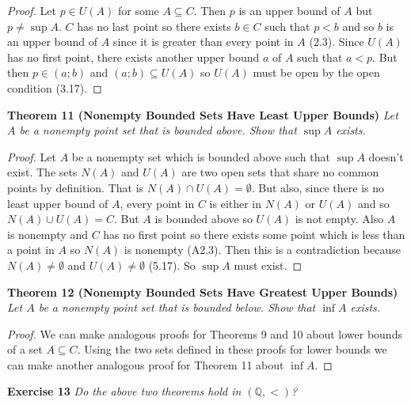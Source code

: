 \documentclass{article}
\begin{document}
\begin{flushleft}
\begin{proof}
Let $p \in U(A)$ for some $A \subseteq C$. Then $p$ is an upper bound of $A$ but $p \neq \sup A$. $C$ has no last point so there exists $b \in C$ such that $p<b$ and so $b$ is an upper bound of $A$ since it is greater than every point in $A$ (2.3). Since $U(A)$ has no first point, there exists another upper bound $a$ of $A$ such that $a<p$. But then $p \in (a;b)$ and $(a;b) \subseteq U(A)$ so $U(A)$ must be open by the open condition (3.17).
\end{proof}

\textbf{Theorem 11 (Nonempty Bounded Sets Have Least Upper Bounds)}
\textsl{Let $A$ be a nonempty point set that is bounded above. Show that $\sup A$ exists.}
\begin{proof}
Let $A$ be a nonempty set which is bounded above such that $\sup A$ doesn't exist. The sets $N(A)$ and $U(A)$ are two open sets that share no common points by definition. That is $N(A) \cap U(A) = \emptyset$. But also, since there is no least upper bound of $A$, every point in $C$ is either in $N(A)$ or $U(A)$ and so $N(A) \cup U(A) = C$. But $A$ is bounded above so $U(A)$ is not empty. Also $A$ is nonempty and $C$ has no first point so there exists some point which is less than a point in $A$ so $N(A)$ is nonempty (A2.3). Then this is a contradiction because $N(A) \neq \emptyset$ and $U(A) \neq \emptyset$ (5.17). So $\sup A$ must exist.
\end{proof}

\textbf{Theorem 12 (Nonempty Bounded Sets Have Greatest Upper Bounds)}
\textsl{Let $A$ be a nonempty point set that is bounded below. Show that $\inf A$ exists.}
\begin{proof}
We can make analogous proofs for Theorems 9 and 10 about lower bounds of a set $A \subseteq C$. Using the two sets defined in these proofs for lower bounds we can make another analogous proof for Theorem 11 about $\inf A$.
\end{proof}

\textbf{Exercise 13}
\textsl{Do the above two theorems hold in $(\mathbb{Q},<)$?}\newline


\end{flushleft}
\end{document}

